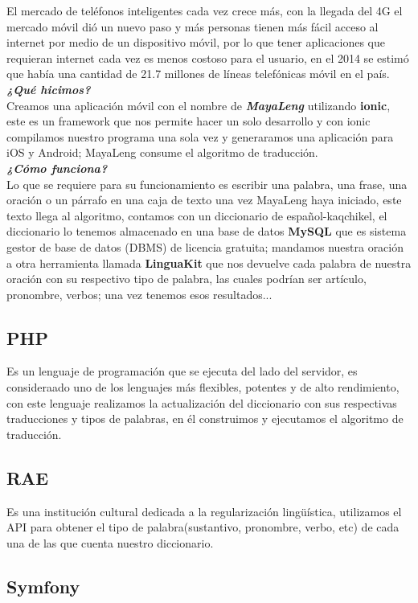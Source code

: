 \documentclass[a4paper,openright,11pt]{article}
\begin{document}
El mercado de teléfonos inteligentes cada vez crece más, con la llegada del 4G el mercado móvil dió un nuevo paso y más personas tienen más fácil acceso al internet por medio de un dispositivo móvil, por lo que tener aplicaciones que requieran internet cada vez es menos costoso para el usuario, en el 2014 se estimó que había una cantidad de 21.7 millones de líneas telefónicas móvil en el país.\\

\textbf{\textit{¿Qué hicimos?}}\\
Creamos una aplicación móvil con el nombre de \textbf{\textit{MayaLeng}} utilizando \textbf{ionic}, este es un framework que nos permite hacer un solo desarrollo y con ionic compilamos nuestro programa una sola vez y generaramos una aplicación para iOS y Android; MayaLeng consume el algoritmo de traducción.\\
\textbf{\textit{¿Cómo funciona?}}\\
Lo que se requiere para su funcionamiento es escribir una palabra, una frase, una oración o un párrafo en una caja de texto una vez MayaLeng haya iniciado, este texto llega al algoritmo, contamos con un diccionario de español-kaqchikel, el diccionario lo tenemos almacenado en una base de datos \textbf{MySQL} que es sistema gestor de base de datos (DBMS) de licencia gratuita; mandamos nuestra oración a otra herramienta llamada \textbf{LinguaKit} que nos devuelve cada palabra de nuestra oración con su respectivo tipo de palabra, las cuales podrían ser artículo, pronombre, verbos; una vez tenemos esos resultados...


\subsection{PHP}
Es un lenguaje de programación que se ejecuta del lado del servidor, es consideraado uno de los lenguajes más flexibles, potentes y de alto rendimiento, con este lenguaje realizamos la actualización del diccionario con sus respectivas traducciones y tipos de palabras, en él construimos y ejecutamos el algoritmo de traducción.
\subsection{RAE}
Es una institución cultural dedicada a la regularización lingüística, utilizamos el API para obtener el tipo de palabra(sustantivo, pronombre, verbo, etc) de cada una de las que cuenta nuestro diccionario.
\subsection{Symfony}
\newpage
\end{document}
